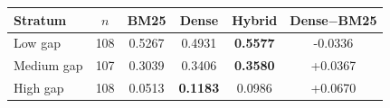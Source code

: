 \begin{tabular}{lSSSSS}
\toprule
\textbf{Stratum} & \textbf{$n$} & \textbf{BM25} & \textbf{Dense} & \textbf{Hybrid} & \textbf{Dense$-$BM25} \\
\midrule
Low gap & 108 & 0.5267 & 0.4931 & \textbf{0.5577} & -0.0336 \\
Medium gap & 107 & 0.3039 & 0.3406 & \textbf{0.3580} & +0.0367 \\
High gap & 108 & 0.0513 & \textbf{0.1183} & 0.0986 & +0.0670 \\
\bottomrule
\end{tabular}
